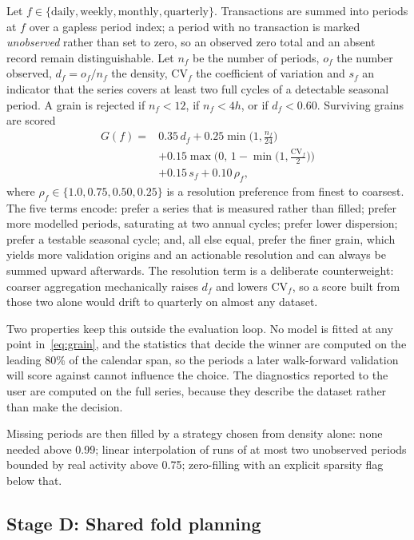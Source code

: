 \documentclass[conference]{IEEEtran}
\begin{document}
Let $f\in\{\text{daily},\text{weekly},\text{monthly},\text{quarterly}\}$.
Transactions are summed into periods at $f$ over a gapless period index; a
period with no transaction is marked \emph{unobserved} rather than set to
zero, so an observed zero total and an absent record remain distinguishable.
Let $n_f$ be the number of periods, $o_f$ the number observed,
$d_f=o_f/n_f$ the density, $\mathrm{CV}_f$ the coefficient of variation and
$s_f$ an indicator that the series covers at least two full cycles of a
detectable seasonal period. A grain is rejected if $n_f<12$, if
$n_f<4h$, or if $d_f<0.60$. Surviving grains are scored
\begin{equation}
\begin{split}
G(f) = {}& 0.35\,d_f + 0.25\min\!\Big(1,\tfrac{n_f}{24}\Big)\\
        & + 0.15\max\!\Big(0,\,1-\min\big(1,\tfrac{\mathrm{CV}_f}{2}\big)\Big)\\
        & + 0.15\,s_f + 0.10\,\rho_f ,
\end{split}
\label{eq:grain}
\end{equation}
where $\rho_f\in\{1.0,0.75,0.50,0.25\}$ is a resolution preference from finest
to coarsest. The five terms encode: prefer a series that is measured rather
than filled; prefer more modelled periods, saturating at two annual cycles;
prefer lower dispersion; prefer a testable seasonal cycle; and, all else
equal, prefer the finer grain, which yields more validation origins and an
actionable resolution and can always be summed upward afterwards. The
resolution term is a deliberate counterweight: coarser aggregation
mechanically raises $d_f$ and lowers $\mathrm{CV}_f$, so a score built from
those two alone would drift to quarterly on almost any dataset.

Two properties keep this outside the evaluation loop. No model is fitted at
any point in~\eqref{eq:grain}, and the statistics that decide the winner are
computed on the leading 80\% of the calendar span, so the periods a later
walk-forward validation will score against cannot influence the choice. The
diagnostics reported to the user are computed on the full series, because
they describe the dataset rather than make the decision.

Missing periods are then filled by a strategy chosen from density alone: none
needed above 0.99; linear interpolation of runs of at most two unobserved
periods bounded by real activity above 0.75; zero-filling with an explicit
sparsity flag below that.

\subsection{Stage D: Shared fold planning}
\end{document}
